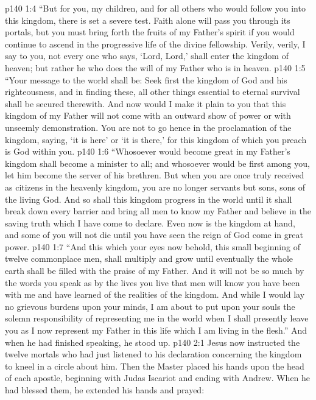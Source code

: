 \vs p140 1:4 \textcolor{ubdarkred}{“But for you, my children, and for all others who would follow you into this kingdom, there is set a severe test. Faith alone will pass you through its portals, but you must bring forth the fruits of my Father’s spirit if you would continue to ascend in the progressive life of the divine fellowship. Verily, verily, I say to you, not every one who says, ‘Lord, Lord,’ shall enter the kingdom of heaven; but rather he who does the will of my Father who is in heaven.}
\vs p140 1:5 \textcolor{ubdarkred}{“Your message to the world shall be: Seek first the kingdom of God and his righteousness, and in finding these, all other things essential to eternal survival shall be secured therewith. And now would I make it plain to you that this kingdom of my Father will not come with an outward show of power or with unseemly demonstration. You are not to go hence in the proclamation of the kingdom, saying, ‘it is here’ or ‘it is there,’ for this kingdom of which you preach is God within you.}
\vs p140 1:6 \textcolor{ubdarkred}{“Whosoever would become great in my Father’s kingdom shall become a minister to all; and whosoever would be first among you, let him become the server of his brethren. But when you are once truly received as citizens in the heavenly kingdom, you are no longer servants but sons, sons of the living God. And so shall this kingdom progress in the world until it shall break down every barrier and bring all men to know my Father and believe in the saving truth which I have come to declare. Even now is the kingdom at hand, and some of you will not die until you have seen the reign of God come in great power.}
\vs p140 1:7 \textcolor{ubdarkred}{“And this which your eyes now behold, this small beginning of twelve commonplace men, shall multiply and grow until eventually the whole earth shall be filled with the praise of my Father. And it will not be so much by the words you speak as by the lives you live that men will know you have been with me and have learned of the realities of the kingdom. And while I would lay no grievous burdens upon your minds, I am about to put upon your souls the solemn responsibility of representing me in the world when I shall presently leave you as I now represent my Father in this life which I am living in the flesh.”} And when he had finished speaking, he stood up.
\vs p140 2:1 Jesus now instructed the twelve mortals who had just listened to his declaration concerning the kingdom to kneel in a circle about him. Then the Master placed his hands upon the head of each apostle, beginning with Judas Iscariot and ending with Andrew. When he had blessed them, he extended his hands and prayed:
